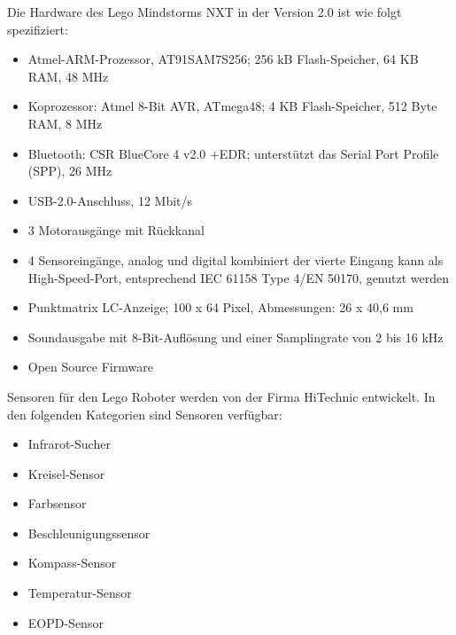 
Die Hardware des Lego Mindstorms NXT in der Version 2.0 ist wie folgt spezifiziert\footnotemark[16]: 


\begin{itemize}
\item Atmel-ARM-Prozessor, AT91SAM7S256; 256 kB Flash-Speicher, 64 KB RAM, 48 MHz
\item Koprozessor: Atmel 8-Bit AVR, ATmega48; 4 KB Flash-Speicher, 512 Byte RAM, 8 MHz
\item Bluetooth: CSR BlueCore 4 v2.0 +EDR; unterstützt das Serial Port Profile (SPP), 26 MHz
\item USB-2.0-Anschluss, 12 Mbit/s
\item 3 Motorausgänge mit Rückkanal
\item 4 Sensoreingänge, analog und digital kombiniert
der vierte Eingang kann als High-Speed-Port, entsprechend IEC 61158 Type 4/EN 50170, genutzt werden
\item Punktmatrix LC-Anzeige; 100 x 64 Pixel, Abmessungen: 26 x 40,6 mm
\item Soundausgabe mit 8-Bit-Auflösung und einer Samplingrate von 2 bis 16 kHz
\item Open Source Firmware
\end{itemize}


Sensoren für den Lego Roboter werden von der Firma HiTechnic entwickelt.
In den folgenden Kategorien sind Sensoren verf\"ugbar:

\begin{itemize}
\item Infrarot-Sucher
\item Kreisel-Sensor
\item Farbsensor
\item Beschleunigungssensor
\item Kompass-Sensor
\item Temperatur-Sensor
\item EOPD-Sensor
\end{itemize}

